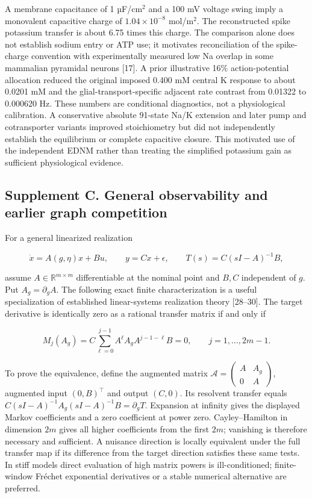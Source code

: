 \documentclass[
  11pt,
]{article}
\begin{document}
A membrane capacitance of 1 µF/cm\(^2\) and a 100 mV voltage swing imply
a monovalent capacitive charge of \(1.04\times10^{-8}\) mol/m\(^2\). The
reconstructed spike potassium transfer is about 6.75 times this charge.
The comparison alone does not establish sodium entry or ATP use; it
motivates reconciliation of the spike-charge convention with
experimentally measured low Na overlap in some mammalian pyramidal
neurons {[}17{]}. A prior illustrative 16\% action-potential allocation
reduced the original imposed 0.400 mM central K response to about 0.0201
mM and the glial-transport-specific adjacent rate contrast from 0.01322
to 0.000620 Hz. These numbers are conditional diagnostics, not a
physiological calibration. A conservative absolute 91-state Na/K
extension and later pump and cotransporter variants improved
stoichiometry but did not independently establish the equilibrium or
complete capacitive closure. This motivated use of the independent EDNM
rather than treating the simplified potassium gain as sufficient
physiological evidence.

\subsection{Supplement C. General observability and earlier graph
competition}\label{supplement-c.-general-observability-and-earlier-graph-competition}

For a general linearized realization

\[\dot x=A(g,\eta)x+Bu,\qquad y=Cx+\epsilon,\qquad T(s)=C(sI-A)^{-1}B,\]

assume \(A\in\mathbb R^{m\times m}\) differentiable at the nominal point
and \(B,C\) independent of \(g\). Put \(A_g=\partial_gA\). The following
exact finite characterization is a useful specialization of established
linear-systems realization theory {[}28--30{]}. The target derivative is
identically zero as a rational transfer matrix if and only if

\[M_j(A_g)=C\sum_{\ell=0}^{j-1}A^\ell A_g A^{j-1-\ell}B=0,\qquad j=1,\ldots,2m-1.\]

To prove the equivalence, define the augmented matrix
\(\mathcal A=\begin{pmatrix}A&A_g\\0&A\end{pmatrix}\), augmented input
\((0,B)^\top\) and output \((C,0)\). Its resolvent transfer equals
\(C(sI-A)^{-1}A_g(sI-A)^{-1}B=\partial_gT\). Expansion at infinity gives
the displayed Markov coefficients and a zero coefficient at power zero.
Cayley--Hamilton in dimension \(2m\) gives all higher coefficients from
the first \(2m\); vanishing is therefore necessary and sufficient. A
nuisance direction is locally equivalent under the full transfer map if
its difference from the target direction satisfies these same tests. In
stiff models direct evaluation of high matrix powers is ill-conditioned;
finite-window Fréchet exponential derivatives or a stable numerical
alternative are preferred.
\end{document}
